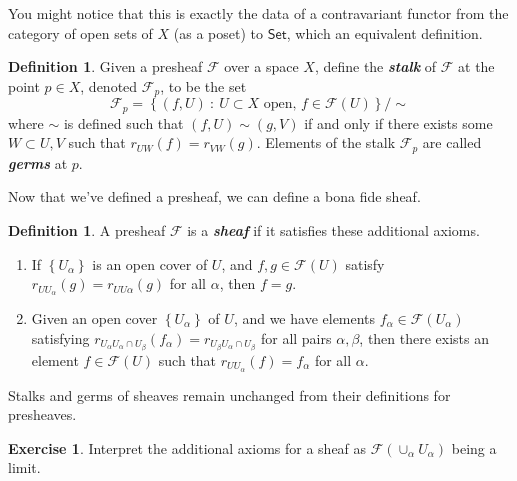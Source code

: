 \documentclass[psamsfonts]{amsart}
\theoremstyle{definition}
\newtheorem{defn}[thm]{Definition}
\newtheorem{exer}[thm]{Exercise}
\theoremstyle{remark}
\newcommand{\ib}[1]{\textbf{\textit{#1}}}
\newcommand{\set}[1]{\left\lbrace #1 \right\rbrace}
\begin{document}
You might notice that this is exactly the data of a contravariant functor from the category of open sets of $X$ (as a poset) to $\mathsf{Set}$, which an equivalent definition.
%
\begin{defn}
Given a presheaf $\mathscr{F}$ over a space $X$, define the \ib{stalk} of $\mathscr{F}$ at the point $p \in X$, denoted $\mathscr{F}_p$, to be the set
$$\mathscr{F}_p = \set{(f,U) ~:~ U \subset X \text{ open, } f \in \mathscr{F}(U)} \big/ \sim $$
where $\sim$ is defined such that $(f,U) \sim (g,V)$ if and only if there exists some $W \subset U,V$ such that $r_{UW}(f) = r_{VW}(g)$. Elements of the stalk $\mathscr{F}_p$ are called \ib{germs} at $p$.
\end{defn}
%
Now that we've defined a presheaf, we can define a bona fide sheaf.
\begin{defn}
A presheaf $\mathscr{F}$ is a \ib{sheaf} if it satisfies these additional axioms.
\begin{enumerate}
\item If $\set{U_\alpha}$ is an open cover of $U$, and $f,g \in \mathscr{F}(U)$ satisfy $r_{UU_\alpha}(g) = r_{UU\alpha}(g)$ for all $\alpha$, then $f = g$.
\item Given an open cover $\set{U_\alpha}$ of $U$, and we have elements $f_\alpha \in \mathscr{F}(U_\alpha)$ satisfying $r_{U_\alpha U_\alpha \cap U_\beta}(f_\alpha) = r_{U_\beta U_\alpha \cap U_\beta}$ for all pairs $\alpha,\beta$, then there exists an element $f \in \mathscr{F}(U)$ such that $r_{UU_\alpha}(f) = f_\alpha$ for all $\alpha$.
\end{enumerate}
Stalks and germs of sheaves remain unchanged from their definitions for presheaves.
\end{defn}
%
\begin{exer}
Interpret the additional axioms for a sheaf as $\mathscr{F}(\cup_\alpha U_\alpha)$ being a limit.
\end{exer}
%
\end{document}
